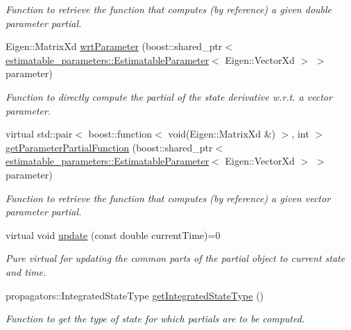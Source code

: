 \begin{DoxyCompactItemize}
\begin{DoxyCompactList}\small\item\em Function to retrieve the function that computes (by reference) a given double parameter partial. \end{DoxyCompactList}\item 
Eigen\+::\+Matrix\+Xd \hyperlink{classtudat_1_1orbit__determination_1_1StateDerivativePartial_a5f1a2329ed66ef25609883c3d56a82c1}{wrt\+Parameter} (boost\+::shared\+\_\+ptr$<$ \hyperlink{classtudat_1_1estimatable__parameters_1_1EstimatableParameter}{estimatable\+\_\+parameters\+::\+Estimatable\+Parameter}$<$ Eigen\+::\+Vector\+Xd $>$ $>$ parameter)
\begin{DoxyCompactList}\small\item\em Function to directly compute the partial of the state derivative w.\+r.\+t. a vector parameter. \end{DoxyCompactList}\item 
virtual std\+::pair$<$ boost\+::function$<$ void(Eigen\+::\+Matrix\+Xd \&) $>$, int $>$ \hyperlink{classtudat_1_1orbit__determination_1_1StateDerivativePartial_a89ee84b266831bc4aa563f22c4afacb5}{get\+Parameter\+Partial\+Function} (boost\+::shared\+\_\+ptr$<$ \hyperlink{classtudat_1_1estimatable__parameters_1_1EstimatableParameter}{estimatable\+\_\+parameters\+::\+Estimatable\+Parameter}$<$ Eigen\+::\+Vector\+Xd $>$ $>$ parameter)
\begin{DoxyCompactList}\small\item\em Function to retrieve the function that computes (by reference) a given vector parameter partial. \end{DoxyCompactList}\item 
virtual void \hyperlink{classtudat_1_1orbit__determination_1_1StateDerivativePartial_a6801a8f31cc0fcdb9679c2db6be3b157}{update} (const double current\+Time)=0
\begin{DoxyCompactList}\small\item\em Pure virtual for updating the common parts of the partial object to current state and time. \end{DoxyCompactList}\item 
propagators\+::\+Integrated\+State\+Type \hyperlink{classtudat_1_1orbit__determination_1_1StateDerivativePartial_a01893338e6faedd93cc0410bb692ce12}{get\+Integrated\+State\+Type} ()
\begin{DoxyCompactList}\small\item\em Function to get the type of state for which partials are to be computed. \end{DoxyCompactList}\item 

\end{DoxyCompactItemize}
